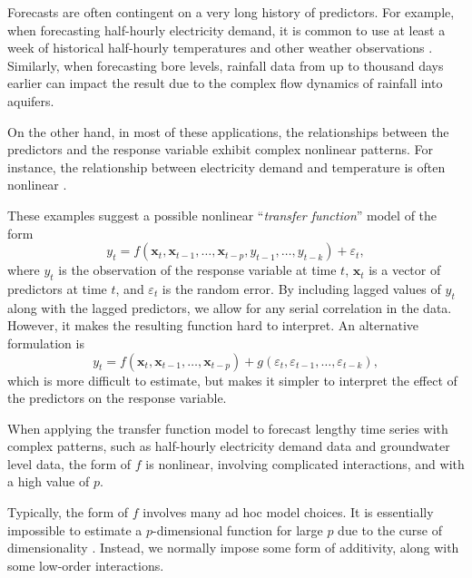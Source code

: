 \documentclass[11pt,a4paper,]{article}
\begin{document}
Forecasts are often contingent on a very long history of predictors. For
example, when forecasting half-hourly electricity demand, it is common
to use at least a week of historical half-hourly temperatures and other
weather observations \autocite{HF2010}. Similarly, when forecasting bore
levels, rainfall data from up to thousand days earlier can impact the
result \autocite{Bakker2019} due to the complex flow dynamics of
rainfall into aquifers.

On the other hand, in most of these applications, the relationships
between the predictors and the response variable exhibit complex
nonlinear patterns. For instance, the relationship between electricity
demand and temperature is often nonlinear \autocite{HF2010,FH2012}.

These examples suggest a possible nonlinear ``\emph{transfer function}''
model of the form \[
 y_t = f(\bm{x}_{t}, \bm{x}_{t-1}, \dots,\bm{x}_{t-p}, y_{t-1},\dots,y_{t-k}) + \varepsilon_{t},
\] where \(y_{t}\) is the observation of the response variable at time
\(t\), \(\bm{x}_{t}\) is a vector of predictors at time \(t\), and
\(\varepsilon_{t}\) is the random error. By including lagged values of
\(y_{t}\) along with the lagged predictors, we allow for any serial
correlation in the data. However, it makes the resulting function hard
to interpret. An alternative formulation is \[
 y_t = f(\bm{x}_{t}, \bm{x}_{t-1}, \dots,\bm{x}_{t-p}) + g(\varepsilon_{t}, \varepsilon_{t-1},\dots,\varepsilon_{t-k}),
\] which is more difficult to estimate, but makes it simpler to
interpret the effect of the predictors on the response variable.

When applying the transfer function model to forecast lengthy time
series with complex patterns, such as half-hourly electricity demand
data and groundwater level data, the form of \(f\) is nonlinear,
involving complicated interactions, and with a high value of \(p\).

Typically, the form of \(f\) involves many ad hoc model choices. It is
essentially impossible to estimate a \(p\)-dimensional function for
large \(p\) due to the curse of dimensionality
\autocite{Bellman57,Stone82}. Instead, we normally impose some form of
additivity, along with some low-order interactions.
\end{document}
